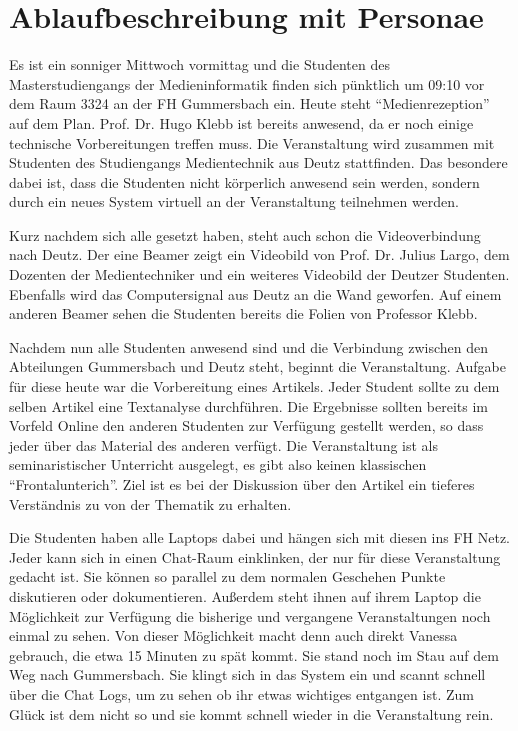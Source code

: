 
\section{Ablaufbeschreibung mit Personae} %
\label{sec:ablaufbeschreibung_mit_personae}

  Es ist ein sonniger Mittwoch vormittag und die Studenten des Masterstudiengangs der Medieninformatik finden sich pünktlich um 09:10 vor dem Raum 3324 an der FH Gummersbach ein. Heute steht "`Medienrezeption"' auf dem Plan. Prof. Dr. Hugo Klebb ist bereits anwesend, da er noch einige technische Vorbereitungen treffen muss. Die Veranstaltung wird zusammen mit Studenten des Studiengangs Medientechnik aus Deutz stattfinden. Das besondere dabei ist, dass die Studenten nicht körperlich anwesend sein werden, sondern durch ein neues System virtuell an der Veranstaltung teilnehmen werden.
  
  Kurz nachdem sich alle gesetzt haben, steht auch schon die Videoverbindung nach Deutz. Der eine Beamer zeigt ein Videobild von Prof. Dr. Julius Largo, dem Dozenten der Medientechniker und ein weiteres Videobild der Deutzer Studenten. Ebenfalls wird das Computersignal aus Deutz an die Wand geworfen. Auf einem anderen Beamer sehen die Studenten bereits die Folien von Professor Klebb.
  
  Nachdem nun alle Studenten anwesend sind und die Verbindung zwischen den Abteilungen Gummersbach und Deutz steht, beginnt die Veranstaltung. Aufgabe für diese heute war die Vorbereitung eines Artikels. Jeder Student sollte zu dem selben Artikel eine Textanalyse durchführen. Die Ergebnisse sollten bereits im Vorfeld Online den anderen Studenten zur Verfügung gestellt werden, so dass jeder über das Material des anderen verfügt. Die Veranstaltung ist als seminaristischer Unterricht ausgelegt, es gibt also keinen klassischen "`Frontalunterich"'. Ziel ist es bei der Diskussion über den Artikel ein tieferes Verständnis zu von der Thematik zu erhalten.
  
  Die Studenten haben alle Laptops dabei und hängen sich mit diesen ins FH Netz. Jeder kann sich in einen Chat-Raum einklinken, der nur für diese Veranstaltung gedacht ist. Sie können so parallel zu dem normalen Geschehen Punkte diskutieren oder dokumentieren. Außerdem steht ihnen auf ihrem Laptop die Möglichkeit zur Verfügung die bisherige und vergangene Veranstaltungen noch einmal zu sehen. Von dieser Möglichkeit macht denn auch direkt Vanessa gebrauch, die etwa 15 Minuten zu spät kommt. Sie stand noch im Stau auf dem Weg nach Gummersbach. Sie klingt sich in das System ein und scannt schnell über die Chat Logs, um zu sehen ob ihr etwas wichtiges entgangen ist. Zum Glück ist dem nicht so und sie kommt schnell wieder in die Veranstaltung rein.
  
